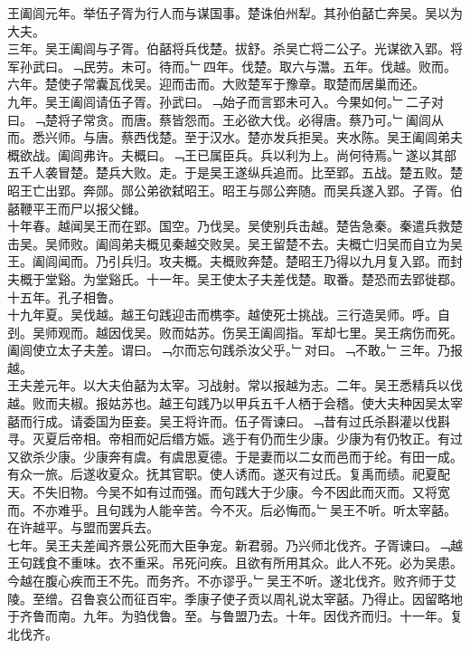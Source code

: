 \documentclass{zhvt-classic}
\begin{document}
\hspace*{2em}王阖闾元年。举伍子胥为行人而与谋国事。楚诛伯州犁。其孙伯嚭亡奔吴。吴以为大夫。\\
\hspace*{2em}三年。吴王阖闾与子胥。伯嚭将兵伐楚。拔舒。杀吴亡将二公子。光谋欲入郢。将军孙武曰。﹁民劳。未可。待而。﹂四年。伐楚。取六与灊。五年。伐越。败而。六年。楚使子常囊瓦伐吴。迎而击而。大败楚军于豫章。取楚而居巢而还。\\
\hspace*{2em}九年。吴王阖闾请伍子胥。孙武曰。﹁始子而言郢未可入。今果如何。﹂二子对曰。﹁楚将子常贪。而唐。蔡皆怨而。王必欲大伐。必得唐。蔡乃可。﹂阖闾从而。悉兴师。与唐。蔡西伐楚。至于汉水。楚亦发兵拒吴。夹水陈。吴王阖闾弟夫概欲战。阖闾弗许。夫概曰。﹁王已属臣兵。兵以利为上。尚何待焉。﹂遂以其部五千人袭冒楚。楚兵大败。走。于是吴王遂纵兵追而。比至郢。五战。楚五败。楚昭王亡出郢。奔郧。郧公弟欲弑昭王。昭王与郧公奔随。而吴兵遂入郢。子胥。伯嚭鞭平王而尸以报父雠。\\
\hspace*{2em}十年春。越闻吴王而在郢。国空。乃伐吴。吴使别兵击越。楚告急秦。秦遣兵救楚击吴。吴师败。阖闾弟夫概见秦越交败吴。吴王留楚不去。夫概亡归吴而自立为吴王。阖闾闻而。乃引兵归。攻夫概。夫概败奔楚。楚昭王乃得以九月复入郢。而封夫概于堂谿。为堂谿氏。十一年。吴王使太子夫差伐楚。取番。楚恐而去郢徙鄀。\\
\hspace*{2em}十五年。孔子相鲁。\\
\hspace*{2em}十九年夏。吴伐越。越王句践迎击而槜李。越使死士挑战。三行造吴师。呼。自刭。吴师观而。越因伐吴。败而姑苏。伤吴王阖闾指。军却七里。吴王病伤而死。阖闾使立太子夫差。谓曰。﹁尔而忘句践杀汝父乎。﹂对曰。﹁不敢。﹂三年。乃报越。\\
\hspace*{2em}王夫差元年。以大夫伯嚭为太宰。习战射。常以报越为志。二年。吴王悉精兵以伐越。败而夫椒。报姑苏也。越王句践乃以甲兵五千人栖于会稽。使大夫种因吴太宰嚭而行成。请委国为臣妾。吴王将许而。伍子胥谏曰。﹁昔有过氏杀斟灌以伐斟寻。灭夏后帝相。帝相而妃后缗方娠。逃于有仍而生少康。少康为有仍牧正。有过又欲杀少康。少康奔有虞。有虞思夏德。于是妻而以二女而邑而于纶。有田一成。有众一旅。后遂收夏众。抚其官职。使人诱而。遂灭有过氏。复禹而绩。祀夏配天。不失旧物。今吴不如有过而强。而句践大于少康。今不因此而灭而。又将宽而。不亦难乎。且句践为人能辛苦。今不灭。后必悔而。﹂吴王不听。听太宰嚭。在许越平。与盟而罢兵去。\\
\hspace*{2em}七年。吴王夫差闻齐景公死而大臣争宠。新君弱。乃兴师北伐齐。子胥谏曰。﹁越王句践食不重味。衣不重采。吊死问疾。且欲有所用其众。此人不死。必为吴患。今越在腹心疾而王不先。而务齐。不亦谬乎。﹂吴王不听。遂北伐齐。败齐师于艾陵。至缯。召鲁哀公而征百牢。季康子使子贡以周礼说太宰嚭。乃得止。因留略地于齐鲁而南。九年。为驺伐鲁。至。与鲁盟乃去。十年。因伐齐而归。十一年。复北伐齐。\\
\end{document}
